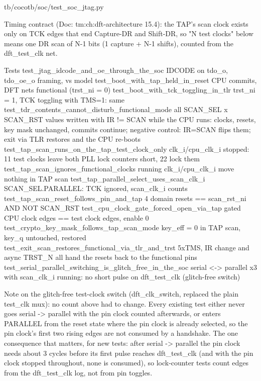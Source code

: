 \begin{relocated}{tb/cocotb/soc/test_soc_jtag.py}
\begin{textblock}
Timing contract (Doc: tm:ch:dft-architecture 15.4): the TAP's scan clock exists only on TCK
edges that end Capture-DR and Shift-DR, so "N test clocks" below means one DR scan of N-1 bits (1
capture + N-1 shifts), counted from the dft_test_clk net.

Tests
test_jtag_idcode_and_oe_through_the_soc      IDCODE on tdo_o, tdo_oe_o framing, vs model
test_boot_with_tap_held_in_reset             CPU commits, DFT nets functional (trst_ni = 0)
test_boot_with_tck_toggling_in_tlr           trst_ni = 1, TCK toggling with TMS=1: same
test_tdr_contents_cannot_disturb_functional_mode
all SCAN_SEL x SCAN_RST values written with
IR != SCAN while the CPU runs: clocks, resets, key
mask unchanged, commits continue; negative control:
IR=SCAN flips them; exit via TLR restores and the
CPU re-boots
test_tap_scan_runs_on_the_tap_test_clock_only
clk_i/cpu_clk_i stopped: 11 test clocks leave both
PLL lock counters short, 22 lock them
test_tap_scan_ignores_functional_clocks      running clk_i/cpu_clk_i move nothing in TAP scan
test_tap_parallel_select_uses_scan_clk_i     SCAN_SEL.PARALLEL: TCK ignored, scan_clk_i counts
test_tap_scan_reset_follows_pin_and_tap      4 domain resets == scan_rst_ni AND NOT SCAN_RST
test_cpu_clock_gate_forced_open_via_tap      gated CPU clock edges == test clock edges, enable 0
test_crypto_key_mask_follows_tap_scan_mode   key_eff = 0 in TAP scan, key_q untouched, restored
test_exit_scan_restores_functional_via_tlr_and_trst
5xTMS, IR change and async TRST_N all hand the
resets back to the functional pins
test_serial_parallel_switching_is_glitch_free_in_the_soc
serial <-> parallel x3 with scan_clk_i running: no
short pulse on dft_test_clk (glitch-free switch)

Note on the glitch-free test-clock switch (dft_clk_switch, replaced the plain test_clk mux): no
count above had to change.  Every existing test either never goes serial -> parallel with the pin
clock counted afterwards, or enters PARALLEL from the reset state where the pin clock is already
selected, so the pin clock's first two rising edges are not consumed by a handshake.  The one
consequence that matters, for new tests: after serial -> parallel the pin clock needs about 3 cycles
before its first pulse reaches dft_test_clk (and with the pin clock stopped throughout, none is
consumed), so lock-counter tests count edges from the dft_test_clk log, not from pin toggles.
\end{textblock}

\end{relocated}


